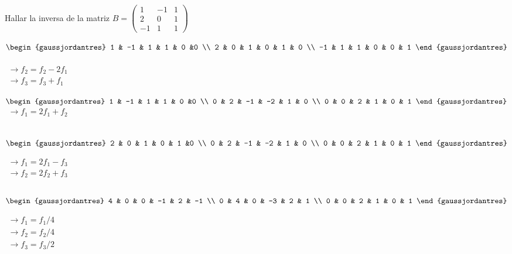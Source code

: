 \begin{ejemplo}
Hallar la inversa de la matriz $B=\begin{pmatrix}
1 & -1 & 1 \\
2 & 0 & 1 \\
-1 & 1 & 1
\end{pmatrix}$

\tcblower
$ \begin{gaussjordantres} 
1 & -1 & 1 & 1 & 0 &0 \\
2 & 0 & 1 & 0 & 1 & 0 \\
-1 & 1 & 1 & 0 & 0 & 1
\end{gaussjordantres} $

$\begin{array}{l}  \\  \rightarrow f_2=f_2-2f_1 \\  \rightarrow f_3=f_3+f_1 \end{array}$

$\begin{gaussjordantres} 
1 & -1 & 1 & 1 & 0 &0 \\
0 & 2 & -1 & -2 & 1 & 0 \\
0 & 0 & 2 & 1 & 0 & 1
\end{gaussjordantres}$
$\begin{array}{l} \rightarrow f_1=2f_1+f_2 \\ \\ \\ \end{array}$

$\begin{gaussjordantres} 
2 & 0 & 1 & 0 & 1 &0 \\
0 & 2 & -1 & -2 & 1 & 0 \\
0 & 0 & 2 & 1 & 0 & 1
\end{gaussjordantres} $

$\begin{array}{l} \rightarrow f_1=2f_1-f_3 \\ \rightarrow f_2=2f_2+f_3 \\ \\ \end{array} $

$\begin{gaussjordantres} 
4 & 0 & 0 & -1 & 2 & -1 \\
0 & 4 & 0 & -3 & 2 & 1 \\
0 & 0 & 2 & 1 & 0 & 1
\end{gaussjordantres}$

$\begin{array}{l} \rightarrow f_1=f_1/4 \\ \rightarrow f_2=f_2/4 \\ \rightarrow f_3=f_3/2 \end{array}  $


\end{ejemplo}
